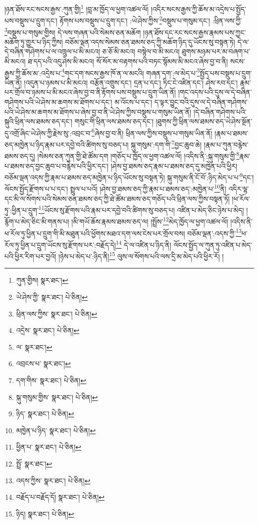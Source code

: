 །ཉན་ཐོས་རང་སངས་རྒྱས་:ཀུན་གྱི།\footnote{ཀུན་གྱིས།  སྣར་ཐང་། } །བླ་མ་ཁྱོད་ལ་ཕྱག་འཚལ་ལོ། །འདིར་སངས་རྒྱས་ཀྱི་ཆོས་མ་འདྲེས་པ་སྤྱོད་པས་བསྡུས་པ་དྲུག་དང་། རྟོགས་པས་བསྡུས་པ་དྲུག་དང་། :ཡེ་ཤེས་ཀྱིས་\footnote{ཡེ་ཤེས་ཀྱི་  སྣར་ཐང་།  པེ་ཅིན། }བསྡུས་པ་གསུམ་དང་། :ཕྲིན་ལས་ཀྱི་\footnote{ཕྲིན་ལས་ཀྱིས་  སྣར་ཐང་།  པེ་ཅིན། }བསྡུས་པ་གསུམ་གྱིས། དེ་ལས་གཞན་པའི་སེམས་ཅན་མཆོག །ཉན་ཐོས་དང་རང་སངས་རྒྱས་རྣམས་པས་ཀྱང་མཆོག་ཏུ་གྱུར་པ་ཉིད་ཀྱིས། བཅོམ་ལྡན་འདས་སེམས་ཅན་ཐམས་ཅད་ཀྱི་མཆོག་ཉིད་དུ་ཡོངས་སུ་བསྟན་ཏེ། དེ་ལ་དེ་བཞིན་གཤེགས་པ་ལ་འཁྲུལ་པ་མི་མངའ། ཅ་ཅོ་མི་མངའ། བསྙེལ་བ་མི་མངའ། ཐུགས་མཉམ་པར་མ་བཞག་པ་མི་མངའ། ཐ་དད་པའི་འདུ་ཤེས་མི་མངའ། སོ་སོར་མ་བརྟགས་པའི་བཏང་སྙོམས་མི་མངའ་ཞེས་བྱ་བ་ནི། སངས་རྒྱས་ཀྱི་ཆོས་མ་:འདྲེས་པ་\footnote{འདྲེས་  སྣར་ཐང་།  པེ་ཅིན། }གང་དག་སངས་རྒྱས་ཁོ་ན་ལ་མངའི། གཞན་དག་:ལ་མེད་པ་\footnote{ལ་  སྣར་ཐང་། }སྤྱོད་པས་བསྡུས་པ་དྲུག་ཡིན་ནོ། །འདུན་པ་ཉམས་པ་མི་མངའ། བརྩོན་འགྲུས་དང་། དྲན་པ་དང་། ཏིང་ངེ་འཛིན་དང་། ཤེས་རབ་དང་། རྣམ་པར་གྲོལ་བ་ཉམས་པ་མི་མངའ་ཞེས་བྱ་བ་ནི་རྟོགས་པས་བསྡུས་པ་དྲུག་ཡིན་ནོ། །གང་འདས་པའི་དུས་ལ་དེ་བཞིན་གཤེགས་པའི་ཡེ་ཤེས་མ་ཆགས་མ་ཐོགས་པ་དང་། མ་འོངས་པ་དང་། ད་ལྟར་བྱུང་བའི་དུས་ལ་དེ་བཞིན་གཤེགས་པའི་ཡེ་ཤེས་མ་ཆགས་མ་ཐོགས་པ་ཞེས་བྱ་བ་ནི་ཡེ་ཤེས་ཀྱིས་བསྡུས་པ་གསུམ་ཡིན་ནོ། །དེ་བཞིན་གཤེགས་པའི་སྐུའི་ཕྲིན་ལས་ཐམས་ཅད་དང་། གསུང་གི་ཕྲིན་ལས་ཐམས་ཅད་དང་། །ཐུགས་ཀྱི་ཕྲིན་ལས་ཐམས་ཅད་ཡེ་ཤེས་སྔོན་དུ་འགྲོ་ཞིང་ཡེ་ཤེས་ཀྱི་རྗེས་སུ་:འབྲང་བ་\footnote{འབྲངས་པ་  སྣར་ཐང་། }ཞེས་བྱ་བ་ནི། ཕྲིན་ལས་ཀྱིས་བསྡུས་པ་གསུམ་ཡིན་ནོ། །རྣམ་པ་ཐམས་ཅད་མཁྱེན་པ་ཉིད་རྣམ་པར་དབྱེ་བའི་ཚིགས་སུ་བཅད་པ། སྐུ་གསུམ་:དག་གི་\footnote{དག་གིས་  སྣར་ཐང་།  པེ་ཅིན། }བྱང་ཆུབ་ཆེ། །རྣམ་པ་ཀུན་བརྙེས་ཐམས་ཅད་དུ། །སེམས་ཅན་ཀུན་གྱི་ཐེ་ཚོམ་དག །གཅོད་པ་ཁྱོད་ལ་ཕྱག་འཚལ་ལོ། །འདིས་ནི་:སྐུ་གསུམ་གྱི་\footnote{སྐུ་གསུམ་གྱིས་  སྣར་ཐང་།  པེ་ཅིན། }རྣམ་པ་ཐམས་ཅད་བྱང་ཆུབ་པ་བརྙེས་པའི་ཕྱིར་དང་། །ཤེས་བྱ་ཐམས་ཅད་རྣམ་པ་ཐམས་ཅད་དུ་མཁྱེན་པའི་ཕྱིར། བཅོམ་ལྡན་འདས་ཀྱི་རྣམ་པ་ཐམས་ཅད་མཁྱེན་པ་ཉིད་ཡོངས་སུ་བསྟན་ཏེ། སྐུ་གསུམ་ནི་ངོ་བོ་:ཉིད་མེད་པ་པ་\footnote{ཉིད་  སྣར་ཐང་།  པེ་ཅིན། }དང་། ལོངས་སྤྱོད་རྫོགས་པ་པ་དང་། སྤྲུལ་པ་པའོ། །ཤེས་བྱ་ཐམས་ཅད་ཀྱི་རྣམ་པ་ཐམས་ཅད་:མཁྱེན་པ་\footnote{མཁྱེན་པ་ཉིད་  སྣར་ཐང་།  པེ་ཅིན། }ནི། འདིར་ལྷ་དང་མི་ལ་སོགས་པའི་སེམས་ཅན་ཐམས་ཅད་ཀྱི་ཐེ་ཚོམ་ཐམས་ཅད་གཅོད་པའི་ཕྲིན་ལས་ཀྱིས་བསྟན་ཏོ། །ཕ་རོལ་ཏུ་:ཕྱིན་པ་དྲུག་\footnote{ཕྱིན་པ་  སྣར་ཐང་།  པེ་ཅིན། }ཡོངས་སུ་རྫོགས་པའི་རྣམ་པར་དབྱེ་བའི་ཚིགས་སུ་བཅད་པ། འཛིན་པ་མེད་ཅིང་ཉེས་པ་མེད། །རྙོག་པ་མེད་ཅིང་མི་གནས་པ། །མི་གཡོ་ཆོས་རྣམས་ཐམས་ཅད་ལ། །སྤྲོས་\footnote{སྤྲོ་  སྣར་ཐང་། }མེད་ཁྱོད་ལ་ཕྱག་འཚལ་ལོ། །འདིས་ནི་ཕ་རོལ་ཏུ་ཕྱིན་པ་དྲུག་གི་མི་མཐུན་པའི་ཕྱོགས་མཐའ་དག་ལས་ངེས་པར་གྲོལ་བས། བཅོམ་ལྡན་:འདས་ཀྱི་\footnote{འདས་ཀྱིས་  སྣར་ཐང་།  པེ་ཅིན། }ཕ་རོལ་ཏུ་ཕྱིན་པ་དྲུག་ཡོངས་སུ་རྫོགས་པར་:བརྗོད་དེ།\footnote{བརྗོད་པ་བརྗོད་དོ།  སྣར་ཐང་།  པེ་ཅིན། } དེ་ལ་འཛིན་པ་ཉིད་ནི། ལོངས་སྤྱོད་ལ་ཀུན་ཏུ་འཛིན་པ་མེད་པའི་ཕྱིར་རིག་པར་བྱའོ། །ཉེས་པ་མེད་པ་:ཉིད་ནི།\footnote{ཉིད།  སྣར་ཐང་།  པེ་ཅིན། } ལུས་ལ་སོགས་པའི་ལས་དྲི་མ་མེད་པའི་ཕྱིར་རོ། །
